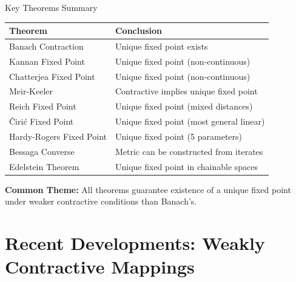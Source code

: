 \documentclass[aspectratio=169,10pt]{beamer}
\begin{document}
\begin{frame}{Key Theorems Summary}
  \begin{table}
    \centering
    \small
    \begin{tabular}{ll}
      \toprule
      \textbf{Theorem} & \textbf{Conclusion} \\
      \midrule
      Banach Contraction & Unique fixed point exists \\
      Kannan Fixed Point & Unique fixed point (non-continuous) \\
      Chatterjea Fixed Point & Unique fixed point (non-continuous) \\
      Meir-Keeler & Contractive implies unique fixed point \\
      Reich Fixed Point & Unique fixed point (mixed distances) \\
      Čirić Fixed Point & Unique fixed point (most general linear) \\
      Hardy-Rogers Fixed Point & Unique fixed point (5 parameters) \\
      Bessaga Converse & Metric can be constructed from iterates \\
      Edelstein Theorem & Unique fixed point in chainable spaces \\
      \bottomrule
    \end{tabular}
  \end{table}

  \vspace{0.3cm}

  \small
  \textbf{Common Theme:} All theorems guarantee existence of a unique fixed point
  under weaker contractive conditions than Banach's.
\end{frame}

\section{Recent Developments: Weakly Contractive Mappings}
\end{document}
